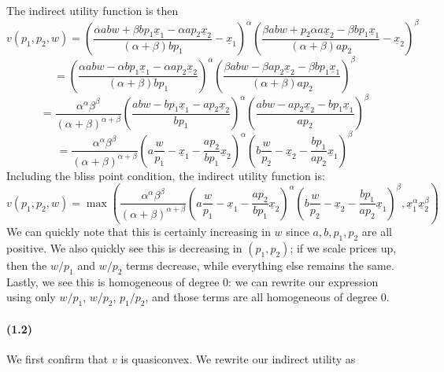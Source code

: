 \documentclass[10pt,letter]{article}
\begin{document}
The indirect utility function is then
\[ v(p_1, p_2, w) = \left(\frac{\alpha abw + \beta bp_1\underline{x}_1- \alpha ap_2 \underline{x}_2}{(\alpha + \beta) b p_1} - \underline{x}_1\right)^\alpha\left(\frac{\beta ab w + p_2 \alpha a\underline{x}_2 - \beta bp_1\underline{x}_1}{(\alpha+\beta) a p_2} - \underline{x}_2\right)^\beta \]
\[  = \left(\frac{\alpha abw - \alpha bp_1\underline{x}_1- \alpha ap_2 \underline{x}_2}{(\alpha + \beta) b p_1} \right)^\alpha\left(\frac{\beta ab w -\beta ap_2\underline{x}_2 - \beta bp_1\underline{x}_1}{(\alpha+\beta) a p_2} \right)^\beta \]
\[  = \frac{\alpha^\alpha \beta^\beta}{(\alpha+\beta)^{\alpha + \beta}}\left(\frac{abw - bp_1\underline{x}_1- ap_2 \underline{x}_2}{ b p_1} \right)^\alpha\left(\frac{ab w -ap_2\underline{x}_2 - bp_1\underline{x}_1}{a p_2} \right)^\beta \]
\[  = \frac{\alpha^\alpha \beta^\beta}{(\alpha+\beta)^{\alpha + \beta}}\left(a\frac{w}{p_1} - \underline{x}_1- \frac{ap_2}{bp_1} \underline{x}_2 \right)^\alpha\left(b \frac{w}{p_2} -\underline{x}_2 - \frac{bp_1}{ap_2}\underline{x}_1 \right)^\beta \]
Including the bliss point condition, the indirect utility function is:
\[  v(p_1, p_2, w) = \max\left( \frac{\alpha^\alpha \beta^\beta}{(\alpha+\beta)^{\alpha + \beta}}\left(a\frac{w}{p_1} - \underline{x}_1- \frac{ap_2}{bp_1} \underline{x}_2 \right)^\alpha\left(b \frac{w}{p_2} -\underline{x}_2 - \frac{bp_1}{ap_2}\underline{x}_1 \right)^\beta,\underline{x}_1^\alpha \underline{x}_2^\beta \right) \]
We can quickly note that this is certainly increasing in $w$ since $a, b, p_1, p_2$ are all positive. We also quickly see this is decreasing in $(p_1, p_2)$; if we scale prices up, then the $w/p_1$ and $w/p_2$ terms decrease, while everything else remains the same. Lastly, we see this is homogeneous of degree 0: we can rewrite our expression using only $w/p_1$, $w/p_2$, $p_1/p_2$, and those terms are all homogeneous of degree 0.

\paragraph{(1.2)}
We first confirm that $v$ is quasiconvex. We rewrite our indirect utility as
\end{document}
